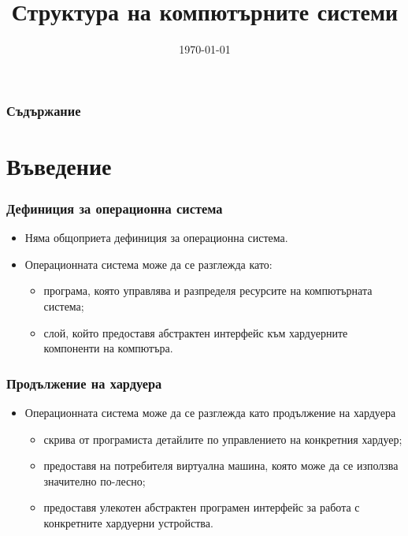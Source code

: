 \documentclass[ignorenonframetext, hyperref=unicode]{beamer}
\title[Структура на КС]{Структура на компютърните системи} \lubo
\date{\today}
\begin{document}
\frame{\maketitle}

\begin{frame}
\frametitle{Съдържание}
\tableofcontents %
\end{frame}

\section{Въведение}

\begin{frame}
\frametitle{Дефиниция за операционна система}
\begin{itemize}
\item Няма общоприета дефиниция за операционна система.
\item Операционната система може да се разглежда като:
\begin{itemize}
\item програма, която управлява и разпределя ресурсите на компютърната
система;
\item слой, който предоставя абстрактен интерфейс към хардуерните компоненти на
компютъра.
\end{itemize}
\end{itemize}
\end{frame}

\begin{frame}\frametitle{Продължение на хардуера}
\begin{itemize}
\item Операционната система може да се разглежда като продължение на хардуера

\begin{itemize}
\item скрива от програмиста детайлите по управлението на конкретния хардуер;
\item предоставя на потребителя виртуална машина, която може да се използва
значително по-лесно;
\item предоставя улекотен абстрактен програмен интерфейс за работа с конкретните
хардуерни устройства.
\end{itemize}


\end{itemize}
\end{frame}
\end{document}
